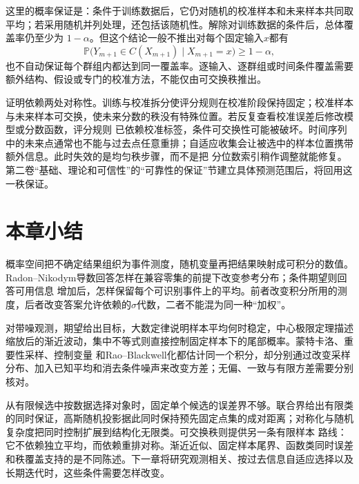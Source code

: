 这里的概率保证是：条件于训练数据后，它仍对随机的校准样本和未来样本共同取平均；若采用随机并列处理，还包括该随机性。解除对训练数据的条件后，总体覆盖率仍至少为
\(1-\alpha\)。但这个结论一般不推出对每个固定输入\(x\)都有
\[
  \mathbb{P}\bigl(
    Y_{m+1}\in C(X_{m+1})
    \mid X_{m+1}=x
  \bigr)
  \geq1-\alpha,
\]
也不自动保证每个群组内都达到同一覆盖率。逐输入、逐群组或时间条件覆盖需要额外结构、假设或专门的校准方法，不能仅由可交换秩推出。

证明依赖两处对称性。训练与校准拆分使评分规则在校准阶段保持固定；校准样本与未来样本可交换，使未来分数的秩没有特殊位置。若反复查看校准误差后修改模型或分数函数，评分规则
已依赖校准标签，条件可交换性可能被破坏。时间序列中的未来点通常也不能与过去点任意重排；自适应收集会让被选中的样本位置携带额外信息。此时失效的是均匀秩步骤，而不是把
分位数索引稍作调整就能修复。
{第二卷“基础、理论和可信性”的“可靠性的保证”节}建立具体预测范围后，将回用这一秩保证。

\section{本章小结}
\label{sec:probability-summary}

概率空间把不确定结果组织为事件测度，随机变量再把结果映射成可积分的数值。Radon--Nikodym导数回答怎样在兼容零集的前提下改变参考分布；条件期望则回答可用信息
增加后，怎样保留每个可识别事件上的平均。前者改变积分所用的测度，后者改变答案允许依赖的\(\sigma\)代数，二者不能混为同一种“加权”。

对带噪观测，期望给出目标，大数定律说明样本平均何时稳定，中心极限定理描述缩放后的渐近波动，集中不等式则直接控制固定样本下的尾部概率。蒙特卡洛、重要性采样、控制变量
和Rao--Blackwell化都估计同一个积分，却分别通过改变采样分布、加入已知平均和消去条件噪声来改变方差；无偏、一致与有限方差需要分别核对。

从有限候选中按数据选择对象时，固定单个候选的误差界不够。联合界给出有限类的同时保证，高斯随机投影据此同时保持预先固定点集的成对距离；对称化与随机复杂度把同时控制扩展到结构化无限类。可交换秩则提供另一条有限样本
路线：它不依赖独立平均，而依赖重排对称。渐近近似、固定样本尾界、函数类同时误差和秩覆盖支持的是不同陈述。下一章将研究观测相关、按过去信息自适应选择以及长期迭代时，这些条件需要怎样改变。
